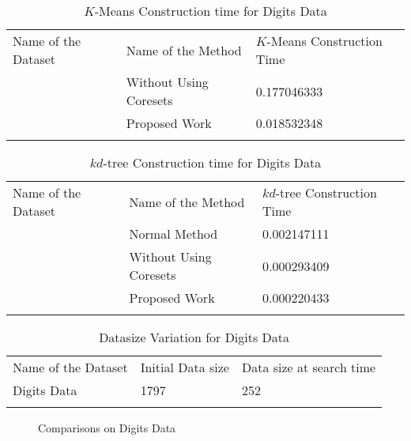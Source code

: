 \documentclass[runningheads]{llncs}
\begin{document}
\begin{table}[!hbt]
	\caption{$K$-Means Construction time for Digits Data}
	\label{tab:9}       %
	\begin{tabular}{p{3cm}p{4cm}p{3.4cm}}
		\hline\noalign{\smallskip}
		Name of the Dataset & Name of the Method & $K$-Means Construction Time  \\
		\noalign{\smallskip}\hline\noalign{\smallskip}
		\multirow{2}{*}{Digits Data} & Without Using Coresets & 0.177046333\\
		& Proposed Work  & 0.018532348\\
		\noalign{\smallskip}\hline\noalign{\smallskip}
	\end{tabular}
\end{table}	
\begin{table}[!hbt]
	\caption{$kd$-tree Construction time for Digits Data}
	\label{tab:8}       %
	\begin{tabular}{p{3cm}p{4cm}p{3.4cm}}
		\hline\noalign{\smallskip}
		Name of the Dataset & Name of the Method & $kd$-tree Construction Time  \\
		\noalign{\smallskip}\hline\noalign{\smallskip}
		\multirow{3}{*}{Digits Data} & Normal Method  & 0.002147111\\
		& Without Using Coresets & 0.000293409\\
		& Proposed Work  & 0.000220433\\
		\noalign{\smallskip}\hline\noalign{\smallskip}
	\end{tabular}
\end{table}
\clearpage
\begin{table}[!hbt]
	\caption{Datasize Variation for Digits Data}
	\label{tab:10}       %
	\begin{tabular}{p{3cm}p{4cm}p{3.4cm}}
		\hline\noalign{\smallskip}
		Name of the Dataset & Initial Data size & Data size at search time  \\
		\noalign{\smallskip}\hline\noalign{\smallskip}
		Digits Data& 1797  & 252 \\
		\noalign{\smallskip}\hline\noalign{\smallskip}
	\end{tabular}
\end{table}

\begin{figure}[!hbt]

	\hspace{0mm}
	\hspace{0mm}
	\caption{Comparisons on Digits Data }
	\label{fig:4}     
\end{figure}
\end{document}
